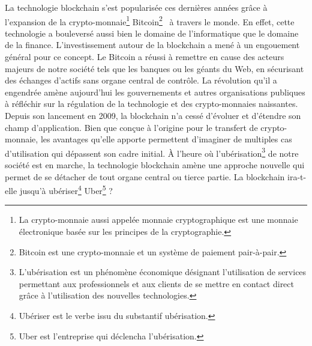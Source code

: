 \documentclass{tnreport}
\begin{document}
La technologie blockchain s'est popularisée ces dernières années grâce à l'expansion de la crypto-monnaie\footnote{La crypto-monnaie aussi appelée monnaie cryptographique est une monnaie électronique basée sur les principes de la cryptographie.} Bitcoin\footnote{Bitcoin est une crypto-monnaie et un système de paiement pair-à-pair.}~\cite{Bitcoin} à travers le monde. 
En effet, cette technologie a bouleversé aussi bien le domaine de l'informatique que le domaine de la finance. 
L'investissement autour de la blockchain a mené à un engouement général pour ce concept. 
Le Bitcoin a réussi à remettre en cause des acteurs majeurs de notre société tels que les banques ou les géants du Web, en sécurisant des échanges d'actifs sans organe central de contrôle. 
La révolution qu'il a engendrée amène aujourd'hui les gouvernements et autres organisations publiques à réfléchir sur la régulation de la technologie et des crypto-monnaies naissantes.
Depuis son lancement en 2009, la blockchain n'a cessé d'évoluer et d'étendre son champ d'application.
Bien que conçue à l'origine pour le transfert de crypto-monnaie, les avantages qu'elle apporte permettent d'imaginer de multiples cas d'utilisation qui dépassent son cadre initial.
À l'heure où l'ubérisation\footnote{L'ubérisation est un phénomène économique désignant l'utilisation de services permettant aux professionnels et aux clients de se mettre en contact direct grâce à l'utilisation des nouvelles technologies.} de notre société est en marche, la technologie blockchain amène une approche nouvelle qui permet de se détacher de tout organe central ou tierce partie. 
La blockchain ira-t-elle jusqu'à ubériser\footnote{Ubériser est le verbe issu du substantif ubérisation.} Uber\footnote{Uber est l'entreprise qui déclencha l'ubérisation.} ?

\end{document}
